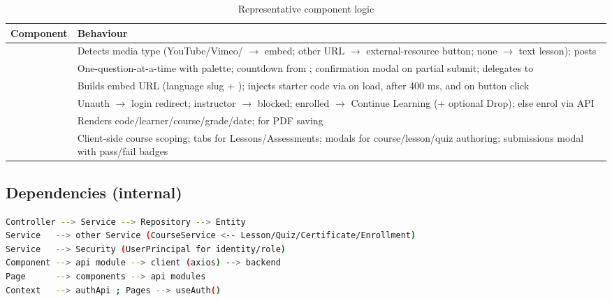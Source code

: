 \begin{table}[H]
\centering
\caption{Representative component logic}
\label{tab:lld-components}
\begin{tabular}{@{}L{3.4cm}L{9.8cm}@{}}
\toprule
\textbf{Component} & \textbf{Behaviour} \\
\midrule
{} & Detects media type (YouTube/Vimeo/ $\rightarrow$ embed; other URL $\rightarrow$ external-resource button; none $\rightarrow$ text lesson);  posts  \\
 & One-question-at-a-time with palette; countdown from ; confirmation modal on partial submit; delegates to  \\
 & Builds embed URL (language slug + ); injects starter code via  on load, after 400 ms, and on button click \\
 & Unauth $\rightarrow$ login redirect; instructor $\rightarrow$ blocked; enrolled $\rightarrow$ Continue Learning (+ optional Drop); else enrol via API \\
 & Renders code/learner/course/grade/date;  for PDF saving \\
 & Client-side course scoping; tabs for Lessons/Assessments; modals for course/lesson/quiz authoring; submissions modal with pass/fail badges \\
\bottomrule
\end{tabular}
\end{table}

\subsection{Dependencies (internal)}

\begin{lstlisting}[language=bash,caption={Internal dependency direction (no cycles beyond declared parent-child)}]
Controller --> Service --> Repository --> Entity
Service   --> other Service (CourseService <-- Lesson/Quiz/Certificate/Enrollment)
Service   --> Security (UserPrincipal for identity/role)
Component --> api module --> client (axios) --> backend
Page      --> components --> api modules
Context   --> authApi ; Pages --> useAuth()
\end{lstlisting}
